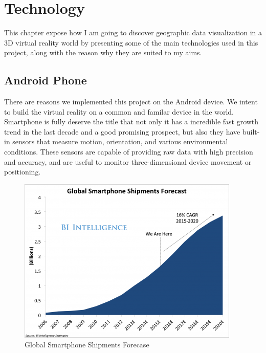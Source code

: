 \label{chapter-technology}
\chapter{Technology}

This chapter expose how I am going to discover geographic data visualization in a 3D virtual reality world by presenting some of the main technologies used in this project, along with the reason why they are suited to my aims.

\section{Android Phone}

There are reasons we implemented this project on the Android device. We intent to build the virtual reality on a common and familar device in the world. Smartphone is fully deserve the title that not only it has a incredible fast growth trend in the last decade and a good promising prospect, but also they have built-in sensors that measure motion, orientation, and various environmental conditions. These sensors are capable of providing raw data with high precision and accuracy, and are useful to monitor three-dimensional device movement or positioning.

\begin{figure}[H]
\caption[smartphone-shipments-forecast]{Global Smartphone Shipments Forecase \parencite{td.global-smartphone-market.2015}}
\label{fig:smartphone-shipments-forecast}
\centering
\includegraphics[width=\linewidth]{Figures/smartphone-shipments-forecast.png}
\decoRule
\end{figure}


